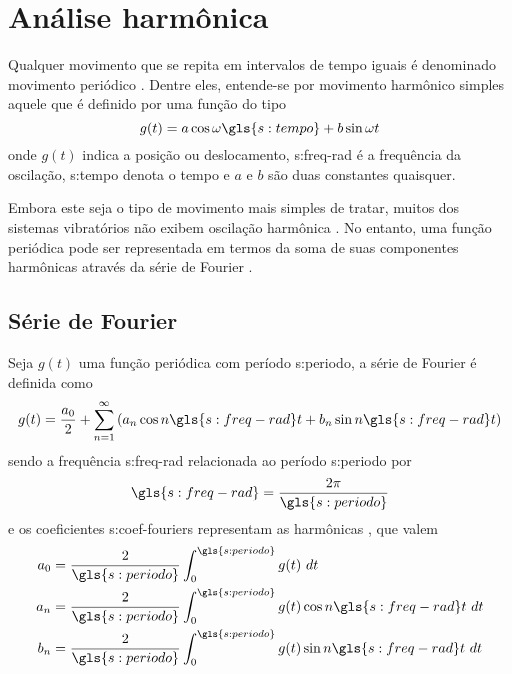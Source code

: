 \documentclass[12pt,oneside,english,brazil,lmodern,siglas,simbolos,cite=num]{ucsmonograph}
\begin{document}
	\section{Análise harmônica}
	Qualquer movimento que se repita em intervalos de tempo iguais é denominado movimento periódico \cite{rao:2008}.
	Dentre eles, entende-se por movimento harmônico simples aquele que é definido por uma função do tipo \cite{timoshenko:1974}
	\begin{equation}
		g(t) = a\cos\omega \gls{s:tempo} + b\sin\omega t
	\end{equation}
	onde $g(t)$ indica a posição ou deslocamento, \gls{s:freq-rad} é a frequência da oscilação, \gls{s:tempo} denota o tempo e $ a $ e $ b $ são duas constantes quaisquer.
	
	Embora este seja o tipo de movimento mais simples de tratar, muitos dos sistemas vibratórios não exibem oscilação harmônica \cite{rao:2008}.
	No entanto, uma função periódica pode ser representada em termos da soma de suas componentes harmônicas através da série de Fourier \cite{clark:1972}.
	
	\subsection{Série de Fourier} \label{sec:fourier:serie}
	Seja $g(t)$ uma função periódica com período \gls{s:periodo}, a série de Fourier é definida como \cite{spiegel:1977}
	\begin{equation}\label{eqn:fourier:serie}
		g(t) = \frac{a_0}{2} + \sum_{n=1}^{\infty}\left(a_n\cos n\gls{s:freq-rad} t + b_n\sin n\gls{s:freq-rad} t \right)
	\end{equation}
	sendo a frequência \gls{s:freq-rad} relacionada ao período \gls{s:periodo} por \cite{dimarogonas:1995}
	\begin{equation}\label{eqn:fourier:periodo}
		\gls{s:freq-rad} = \frac{2\pi}{\gls{s:periodo}}
	\end{equation}
	e os coeficientes \glspl{s:coef-fourier} representam as harmônicas \cite{dimarogonas:1995}, que valem \cite{spiegel:1977}
	\begin{align}\label{eqn:fourier:coefs}
		a_0 &= \frac{2}{\gls{s:periodo}}\int_{0}^{\gls{s:periodo}}g(t)\ dt \notag\\
		a_n &= \frac{2}{\gls{s:periodo}}\int_{0}^{\gls{s:periodo}}g(t)\cos n\gls{s:freq-rad} t\ dt \\
		b_n &= \frac{2}{\gls{s:periodo}}\int_{0}^{\gls{s:periodo}}g(t)\sin n\gls{s:freq-rad} t\ dt \notag
	\end{align}
	
\end{document}
